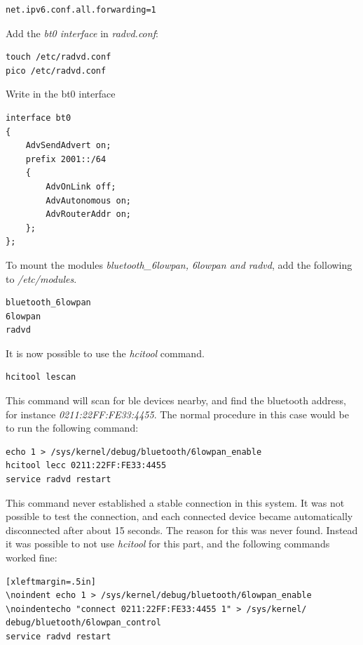 \begin{verbatim}
net.ipv6.conf.all.forwarding=1
\end{verbatim}

Add the \textit{bt0 interface} in \textit{radvd.conf}:

\begin{verbatim}
touch /etc/radvd.conf
pico /etc/radvd.conf
\end{verbatim} 

Write in the bt0 interface

\begin{verbatim}
interface bt0
{
    AdvSendAdvert on;
    prefix 2001::/64
    {
        AdvOnLink off;
        AdvAutonomous on;
        AdvRouterAddr on;
    };
};
\end{verbatim} 

To mount the modules \textit{bluetooth\_6lowpan, 6lowpan and radvd}, add the following to \textit{/etc/modules}. 

\begin{verbatim}
bluetooth_6lowpan
6lowpan
radvd
\end{verbatim}

It is now possible to use the \textit{hcitool} command. 

\begin{verbatim}
hcitool lescan
\end{verbatim}

This command will scan for \gls{ble} devices nearby, and find the bluetooth address, for instance \textit{0211:22FF:FE33:4455}. The normal procedure in this case would be to run the following command: 

\begin{verbatim}
echo 1 > /sys/kernel/debug/bluetooth/6lowpan_enable
hcitool lecc 0211:22FF:FE33:4455
service radvd restart
\end{verbatim}

This command never established a stable connection in this system. It was not possible to test the connection, and each connected device became automatically disconnected after about 15 seconds. The reason for this was never found. Instead it was possible to not use \textit{hcitool} for this part, and the following commands worked fine:

\begin{verbatim}[xleftmargin=.5in]
\noindent echo 1 > /sys/kernel/debug/bluetooth/6lowpan_enable
\noindentecho "connect 0211:22FF:FE33:4455 1" > /sys/kernel/
debug/bluetooth/6lowpan_control
service radvd restart
\end{verbatim} 

